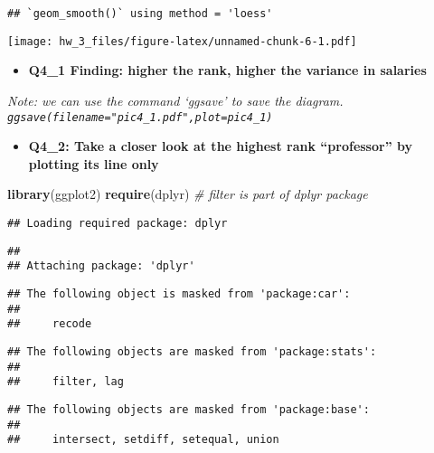 \documentclass[]{article}
\newenvironment{Shaded}{\begin{snugshade}}{\end{snugshade}}
\newcommand{\KeywordTok}[1]{\textcolor[rgb]{0.13,0.29,0.53}{\textbf{{#1}}}}
\newcommand{\CommentTok}[1]{\textcolor[rgb]{0.56,0.35,0.01}{\textit{{#1}}}}
\newcommand{\NormalTok}[1]{{#1}}
\providecommand{\tightlist}{%
  \setlength{\itemsep}{0pt}\setlength{\parskip}{0pt}}
\begin{document}
\begin{verbatim}
## `geom_smooth()` using method = 'loess'
\end{verbatim}

\texttt{[image: hw\_3\_files/figure-latex/unnamed-chunk-6-1.pdf]}

\begin{itemize}
\tightlist
\item
  \textbf{Q4\_1 Finding: higher the rank, higher the variance in
  salaries}
\end{itemize}

\emph{Note: we can use the command `ggsave' to save the diagram.
\texttt{ggsave(filename="pic4\_1.pdf",plot=pic4\_1)}}

\begin{itemize}
\tightlist
\item
  \textbf{Q4\_2: Take a closer look at the highest rank ``professor'' by
  plotting its line only}
\end{itemize}

\begin{Shaded}
\begin{Highlighting}[]
\KeywordTok{library}\NormalTok{(ggplot2)}
\KeywordTok{require}\NormalTok{(dplyr) }\CommentTok{# filter is part of dplyr package}
\end{Highlighting}
\end{Shaded}

\begin{verbatim}
## Loading required package: dplyr
\end{verbatim}

\begin{verbatim}
## 
## Attaching package: 'dplyr'
\end{verbatim}

\begin{verbatim}
## The following object is masked from 'package:car':
## 
##     recode
\end{verbatim}

\begin{verbatim}
## The following objects are masked from 'package:stats':
## 
##     filter, lag
\end{verbatim}

\begin{verbatim}
## The following objects are masked from 'package:base':
## 
##     intersect, setdiff, setequal, union
\end{verbatim}
\end{document}
